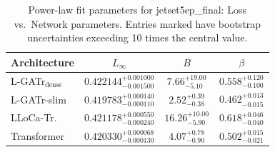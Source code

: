 \begin{table}[h]
  \centering
  \begin{tabular}{lccc}
    \toprule
    Architecture & $L_\infty$ & $B$ & $\beta$ \\
    \midrule
    L-GATr$_\mathrm{dense}$ & $0.422144^{+0.001000}_{-0.001500}$ & $7.66^{+19.00}_{-5.10}$ & $0.558^{+0.120}_{-0.100}$ \\
    L-GATr-slim & $0.419783^{+0.000140}_{-0.000110}$ & $2.52^{+0.39}_{-0.38}$ & $0.462^{+0.013}_{-0.015}$ \\
    LLoCa-Tr. & $0.421178^{+0.000550}_{-0.000240}$ & $16.26^{+10.00}_{-5.90}$ & $0.618^{+0.046}_{-0.040}$ \\
    Transformer & $0.420330^{+0.000068}_{-0.000130}$ & $4.07^{+0.78}_{-0.90}$ & $0.502^{+0.015}_{-0.021}$ \\
    \bottomrule
  \end{tabular}
  \caption{Power-law fit parameters for jetset5ep\_final: Loss vs.\ Network parameters. Entries marked \textemdash{} have bootstrap uncertainties exceeding 10 times the central value.}
  \label{tab:jetset5ep_final}
\end{table}
